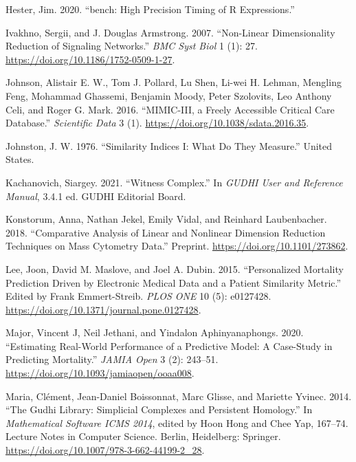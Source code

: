 \documentclass{article}
\newlength{\cslhangindent}
\newlength{\cslentryspacingunit} %
\newenvironment{CSLReferences}[2] %
 {%
  \setlength{\parindent}{0pt}
  \ifodd #1
  \let\oldpar\par
  \def\par{\hangindent=\cslhangindent\oldpar}
  \fi
  \setlength{\parskip}{#2\cslentryspacingunit}
 }%
 {}
\begin{document}
\begin{CSLReferences}{1}{0}
\leavevmode{}%
Hester, Jim. 2020. {``{bench}: {High Precision Timing} of {R
Expressions}.''}

\leavevmode{}%
Ivakhno, Sergii, and J. Douglas Armstrong. 2007. {``Non-Linear
Dimensionality Reduction of Signaling Networks.''} \emph{BMC Syst Biol}
1 (1): 27. \url{https://doi.org/10.1186/1752-0509-1-27}.

\leavevmode{}%
Johnson, Alistair E. W., Tom J. Pollard, Lu Shen, Li-wei H. Lehman,
Mengling Feng, Mohammad Ghassemi, Benjamin Moody, Peter Szolovits, Leo
Anthony Celi, and Roger G. Mark. 2016. {``{MIMIC-III}, a Freely
Accessible Critical Care Database.''} \emph{Scientific Data} 3 (1).
\url{https://doi.org/10.1038/sdata.2016.35}.

\leavevmode{}%
Johnston, J. W. 1976. {``Similarity Indices {I}: What Do They
Measure.''} {United States}.

\leavevmode{}%
Kachanovich, Siargey. 2021. {``Witness Complex.''} In \emph{{GUDHI User}
and {Reference Manual}}, 3.4.1 ed. {GUDHI Editorial Board}.

\leavevmode{}%
Konstorum, Anna, Nathan Jekel, Emily Vidal, and Reinhard Laubenbacher.
2018. {``Comparative {Analysis} of {Linear} and {Nonlinear Dimension
Reduction Techniques} on {Mass Cytometry Data}.''} Preprint.
\url{https://doi.org/10.1101/273862}.

\leavevmode{}%
Lee, Joon, David M. Maslove, and Joel A. Dubin. 2015. {``Personalized
{Mortality Prediction Driven} by {Electronic Medical Data} and a
{Patient Similarity Metric}.''} Edited by Frank Emmert-Streib.
\emph{PLOS ONE} 10 (5): e0127428.
\url{https://doi.org/10.1371/journal.pone.0127428}.

\leavevmode{}%
Major, Vincent J, Neil Jethani, and Yindalon Aphinyanaphongs. 2020.
{``Estimating Real-World Performance of a Predictive Model: A Case-Study
in Predicting Mortality.''} \emph{JAMIA Open} 3 (2): 243--51.
\url{https://doi.org/10.1093/jamiaopen/ooaa008}.

\leavevmode{}%
Maria, Clément, Jean-Daniel Boissonnat, Marc Glisse, and Mariette
Yvinec. 2014. {``The {Gudhi Library}: {Simplicial Complexes} and
{Persistent Homology}.''} In \emph{Mathematical {Software} \textendash{}
{ICMS} 2014}, edited by Hoon Hong and Chee Yap, 167--74. Lecture {Notes}
in {Computer Science}. {Berlin, Heidelberg}: {Springer}.
\url{https://doi.org/10.1007/978-3-662-44199-2_28}.


\end{CSLReferences}
\end{document}
